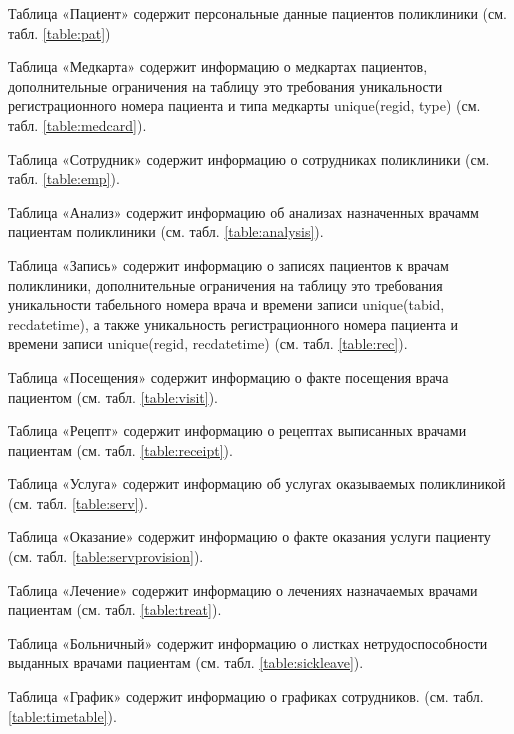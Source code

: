 \documentclass[14pt,a4paper,russian]{extreport}
\begin{document}
Таблица «Пациент» содержит персональные данные пациентов поликлиники (см. табл.
\ref{table:pat})\par
Таблица «Медкарта» содержит информацию о медкартах пациентов, дополнительные ограничения на таблицу
это требования уникальности регистрационного номера пациента и типа медкарты unique(regid, type) (см. табл.
\ref{table:medcard}).\par
Таблица «Сотрудник» содержит информацию о сотрудниках поликлиники (см. табл. \ref{table:emp}).\par
Таблица «Анализ» содержит информацию об анализах назначенных врачамм пациентам поликлиники (см.
табл. \ref{table:analysis}).\par
Таблица «Запись» содержит информацию о записях пациентов к врачам поликлиники,
дополнительные ограничения на таблицу это требования уникальности табельного номера врача и времени
записи unique(tabid, recdatetime), а также уникальность регистрационного номера пациента и времени
записи unique(regid, recdatetime) (см. табл. \ref{table:rec}).\par
Таблица «Посещения» содержит информацию о факте посещения врача пациентом (см. табл.
\ref{table:visit}).\par
Таблица «Рецепт» содержит информацию о рецептах выписанных врачами пациентам (см. табл.
\ref{table:receipt}).\par
Таблица «Услуга» содержит информацию об услугах оказываемых поликлиникой (см. табл. \ref{table:serv}).\par
Таблица «Оказание» содержит информацию о факте оказания услуги пациенту (см. табл.
\ref{table:servprovision}).\par
Таблица «Лечение» содержит информацию о лечениях назначаемых врачами пациентам (см. табл.
\ref{table:treat}).\par
Таблица «Больничный» содержит информацию о листках нетрудоспособности выданных врачами пациентам
(см. табл. \ref{table:sickleave}).\par
Таблица «График» содержит информацию о графиках сотрудников.
(см. табл. \ref{table:timetable}).\par
\end{document}
